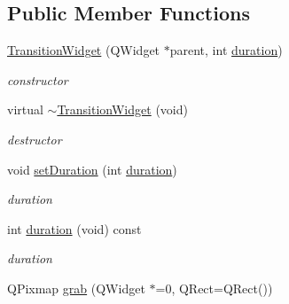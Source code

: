 \subsection*{Public Member Functions}
\begin{DoxyCompactItemize}
\item 
\mbox{\label{class_transition_widget_ab36267503b56fa99b5e4cc7895dcd50b}} 
\hyperlink{class_transition_widget_ab36267503b56fa99b5e4cc7895dcd50b}{Transition\+Widget} (Q\+Widget $\ast$parent, int \hyperlink{class_transition_widget_abe4cb895693e7d32d1412ec8f7ffe6da}{duration})
\begin{DoxyCompactList}\small\item\em constructor \end{DoxyCompactList}\item 
\mbox{\label{class_transition_widget_a649484b3dad025044713c13cbe199422}} 
virtual \hyperlink{class_transition_widget_a649484b3dad025044713c13cbe199422}{$\sim$\+Transition\+Widget} (void)
\begin{DoxyCompactList}\small\item\em destructor \end{DoxyCompactList}\item 
\mbox{\label{class_transition_widget_a2151eb36aa19f628d1e63b8ced378b7a}} 
void \hyperlink{class_transition_widget_a2151eb36aa19f628d1e63b8ced378b7a}{set\+Duration} (int \hyperlink{class_transition_widget_abe4cb895693e7d32d1412ec8f7ffe6da}{duration})
\begin{DoxyCompactList}\small\item\em duration \end{DoxyCompactList}\item 
\mbox{\label{class_transition_widget_abe4cb895693e7d32d1412ec8f7ffe6da}} 
int \hyperlink{class_transition_widget_abe4cb895693e7d32d1412ec8f7ffe6da}{duration} (void) const
\begin{DoxyCompactList}\small\item\em duration \end{DoxyCompactList}\item 
\mbox{\label{class_transition_widget_a17f312df9811c2ebe60c3d0817001a18}} 
Q\+Pixmap \hyperlink{class_transition_widget_a17f312df9811c2ebe60c3d0817001a18}{grab} (Q\+Widget $\ast$=0, Q\+Rect=Q\+Rect())

\end{DoxyCompactItemize}
